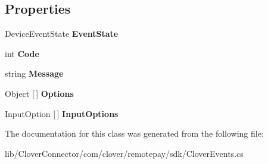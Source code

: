 \subsection*{Properties}
\begin{DoxyCompactItemize}
\item 
\mbox{\label{classcom_1_1clover_1_1remotepay_1_1sdk_1_1_clover_device_event_a5d6c86f9855c46c813acd9563f9c99ab}} 
Device\+Event\+State {\bfseries Event\+State}
\item 
\mbox{\label{classcom_1_1clover_1_1remotepay_1_1sdk_1_1_clover_device_event_ae3422a3a9dcd7e8c1c7b20c410b24d9f}} 
int {\bfseries Code}
\item 
\mbox{\label{classcom_1_1clover_1_1remotepay_1_1sdk_1_1_clover_device_event_aec34f3a982ec78a0a03499f1c309bde3}} 
string {\bfseries Message}
\item 
\mbox{\label{classcom_1_1clover_1_1remotepay_1_1sdk_1_1_clover_device_event_ae31e3c80cfdd87b897ba14d017a21599}} 
Object \mbox{[}$\,$\mbox{]} {\bfseries Options}
\item 
\mbox{\label{classcom_1_1clover_1_1remotepay_1_1sdk_1_1_clover_device_event_aeeac7f67f737137d1b9ec633b7823d6a}} 
Input\+Option \mbox{[}$\,$\mbox{]} {\bfseries Input\+Options}
\end{DoxyCompactItemize}


The documentation for this class was generated from the following file\+:\begin{DoxyCompactItemize}
\item 
lib/\+Clover\+Connector/com/clover/remotepay/sdk/Clover\+Events.\+cs\end{DoxyCompactItemize}
